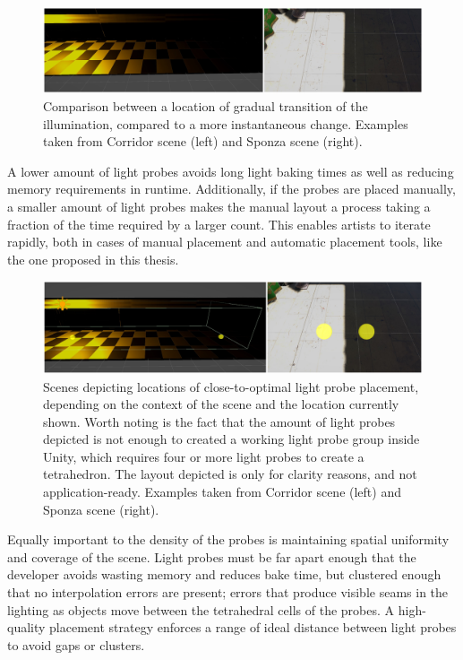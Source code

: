 \begin{figure}[h]
	\centering
	\includegraphics[width=\linewidth]{Graphics/results/concats/comparison7.png}
	\caption{Comparison between a location of gradual transition of the illumination, compared to a more instantaneous change. Examples taken from Corridor scene (left) and Sponza scene (right).}
	\label{fig:transition_comparison}
\end{figure}

A lower amount of light probes avoids long light baking times as well as reducing memory requirements in runtime. Additionally, if the probes are placed manually, a smaller amount of light probes makes the manual layout a process taking a fraction of the time required by a larger count. This enables artists to iterate rapidly, both in cases of manual placement and automatic placement tools, like the one proposed in this thesis.

\begin{figure}[h]
	\centering
	\includegraphics[width=\linewidth]{Graphics/results/concats/comparison8.png}
	\caption{Scenes depicting locations of close-to-optimal light probe placement, depending on the context of the scene and the location currently shown. Worth noting is the fact that the amount of light probes depicted is not enough to created a working light probe group inside Unity, which requires four or more light probes to create a tetrahedron. The layout depicted is only for clarity reasons, and not application-ready. Examples taken from Corridor scene (left) and Sponza scene (right).}
	\label{fig:transition_comparison_lp}
\end{figure}

Equally important to the density of the probes is maintaining spatial uniformity and coverage of the scene. Light probes must be far apart enough that the developer avoids wasting memory and reduces bake time, but clustered enough that no interpolation errors are present; errors that produce visible seams in the lighting as objects move between the tetrahedral cells of the probes. A high-quality placement strategy enforces a range of ideal distance between light probes to avoid gaps or clusters.

